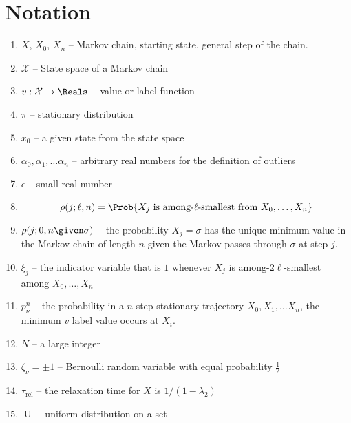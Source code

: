 \documentclass[12pt]{article}
\begin{document}
\section*{Notation}
\begin{enumerate}
    \item
        \( X \), \( X_0 \), \( X_n \) -- Markov chain, starting state,
        general step of the chain.
    \item
        \( \mathcal{X} \) -- State space of a Markov chain
    \item
        \( v :  \mathcal{X} \to \Reals \) -- value or label function
    \item
        \( \pi \) -- stationary distribution
    \item
        \( x_0 \) -- a given state from the state space
    \item
        \( \alpha_0, \alpha_1, \dots \alpha_n \) -- arbitrary real
        numbers for the definition of outliers
    \item
        \( \epsilon \) -- small real number
    \item
        \[
            \rho(j; \ell, n) = \Prob{X_j \text{ is among-\( \ell \)-smallest
            from } X_0, \dots, X_n }
        \]
    \item
        \( \rho(j; 0, n \given \sigma) \) -- the probability \( X_j =
        \sigma \) has the unique minimum value in the Markov chain of
        length \( n \) given the Markov passes through \( \sigma \) at
        step \( j \).
    \item
        \( \xi_j \) -- the indicator variable that is \( 1 \) whenever \(
        X_j \) is among-\( 2\ell \)-smallest among \( X_0, \dots , X_n \)
    \item
        \( p_{\nu}^n \) -- the probability in a \( n \)-step stationary
        trajectory \( X_0, X_1, \dots X_n \), the minimum \( v \) label
        value occurs at \( X_i \).
    \item
        \( N \) -- a large integer
    \item
        \( \zeta_{\nu} = \pm 1 \) -- Bernoulli random variable with
        equal probability \( \frac{1}{2} \)
    \item
        \( \tau_{\text{rel}} \) -- the relaxation time for \( X \) is \(
        1/ (1-\lambda_2) \)
    \item
        \(
        \operatorname{U}
        \) -- uniform distribution on a set
\end{enumerate}
\end{document}
